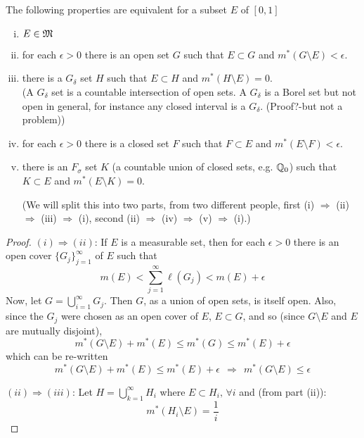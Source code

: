 \pagebreak
\begin{pblm}%
	The following properties are equivalent for a subset $E$ of $[0,1]$
	\begin{enumerate}[(i)]
		\item $E \in \mathfrak{M}$
		\item for each $\epsilon > 0$ there is an open set $G$ such that 
		$E \subset G$ and $m^\ast(G\setminus E) < \epsilon$. 
		\item there is a $G_\delta$ set $H$ such that $E \subset H$ and 
		$m^\ast(H\setminus E) = 0$. \\
		(A $G_\delta$ set is a countable intersection of open sets. A 
		$G_\delta$ is a Borel set but not open in general, for instance 
		any closed interval is a $G_\delta$. (Proof?-but not a problem))
		\item for each $\epsilon > 0$ there is a closed set $F$ such that 
		$F \subset E$ and $m^\ast(E\setminus F) < \epsilon$. 
		\item there is an $F_\sigma$ set $K$ (a countable union of closed 
		sets, e.g. $\mathbb{Q}_0$) such that $K \subset E$ and 
		$m^\ast(E\setminus K) = 0$. 

		(We will split this into two parts, from two different people, 
		first (i) $\Rightarrow$ (ii) $\Rightarrow$ (iii) $\Rightarrow$ (i), 
		second (ii) $\Rightarrow$ (iv) $\Rightarrow$ (v) $\Rightarrow$ (i).)
	\end{enumerate}
\begin{proof}
\noindent $(i) \Rightarrow (ii)$: If $E$ is a measurable set, then for each 
	$\epsilon > 0$ there is an open cover $\{G_j\}_{j=1}^\infty$ of $E$ such that 
	\begin{equation*}
		m(E) < \sum\limits_{j=1}^\infty \ell(G_j) < m(E) + \epsilon
	\end{equation*}
	Now, let $G = \bigcup\limits_{i=1}^\infty G_j$. Then 
	$G$, as a union of open sets, is itself open. Also, since the $G_j$ were 
	chosen as an open cover of $E$,  $E \subset G$, and so (since $G\setminus E$ 
	and $E$ are mutually disjoint), 
	\begin{equation*}
		m^\ast(G \setminus E) + m^\ast(E) \le m^\ast(G) \le m^\ast(E) + \epsilon
	\end{equation*}
	which can be re-written 
	\begin{equation*}
		m^\ast(G \setminus E) + m^\ast(E) \le m^\ast(E) + \epsilon ~~ \Rightarrow ~~ m^\ast(G \setminus E) \le \epsilon
	\end{equation*}

\noindent $(ii) \Rightarrow (iii)$: 
	Let $H=\bigcup\limits_{k=1}^\infty H_i$ where $E\subset H_i,\,\forall i$ and (from part (ii)): 
	\begin{equation*}
		m^\ast(H_i\setminus E) = \frac{1}{i}
	\end{equation*}


\end{proof}
\end{pblm}
